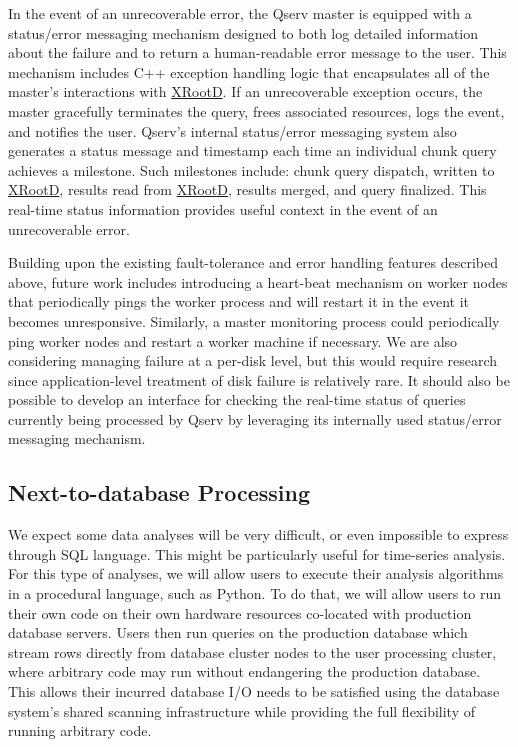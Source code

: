 \documentclass[DM,lsstdraft,toc]{lsstdoc}
\begin{document}
In the event of an unrecoverable error, the Qserv master is equipped
with a status/error messaging mechanism designed to both log detailed
information about the failure and to return a human-readable error
message to the user. This mechanism includes C++ exception handling
logic that encapsulates all of the master's interactions with
\href{http://xrootd.org}{XRootD}. If an unrecoverable exception occurs,
the master gracefully terminates the query, frees associated resources,
logs the event, and notifies the user. Qserv's internal status/error
messaging system also generates a status message and timestamp each time
an individual chunk query achieves a milestone. Such milestones include:
chunk query dispatch, written to \href{http://xrootd.org}{XRootD},
results read from \href{http://xrootd.org}{XRootD}, results merged, and
query finalized. This real-time status information provides useful
context in the event of an unrecoverable error.

Building upon the existing fault-tolerance and error handling features
described above, future work includes introducing a heart-beat mechanism
on worker nodes that periodically pings the worker process and will
restart it in the event it becomes unresponsive. Similarly, a master
monitoring process could periodically ping worker nodes and restart a
worker machine if necessary. We are also considering managing failure at
a per-disk level, but this would require research since
application-level treatment of disk failure is relatively rare. It
should also be possible to develop an interface for checking the
real-time status of queries currently being processed by Qserv by
leveraging its internally used status/error messaging mechanism.

\subsection{Next-to-database
Processing}\label{next-to-database-processing}

We expect some data analyses will be very difficult, or even impossible
to express through SQL language. This might be particularly useful for
time-series analysis. For this type of analyses, we will allow users to
execute their analysis algorithms in a procedural language, such as
Python. To do that, we will allow users to run their own code on their
own hardware resources co-located with production database servers.
Users then run queries on the production database which stream rows
directly from database cluster nodes to the user processing cluster,
where arbitrary code may run without endangering the production
database. This allows their incurred database I/O needs to be satisfied
using the database system's shared scanning infrastructure while
providing the full flexibility of running arbitrary code.
\end{document}
